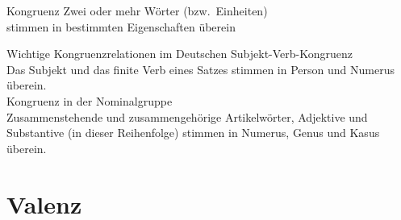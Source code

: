 \begin{frame}
  {Kongruenz}
  \onslide<+->
  \onslide<+->
  Zwei oder mehr Wörter (bzw.\ Einheiten)\\
  \alert{stimmen in bestimmten Eigenschaften überein}\\
  \onslide<+->
  \Zeile
  \begin{exe}
    \ex
    \begin{xlist}
    \end{xlist}
  \end{exe}
  \onslide<+->
  \Halbzeile
  \begin{exe}
    \ex
    \begin{xlist}
    \end{xlist}
  \end{exe}
\end{frame}

\begin{frame}
  {Wichtige Kongruenzrelationen im Deutschen}
  \onslide<+->
  \onslide<+->
  \alert{Subjekt-Verb-Kongruenz}\\
  \Viertelzeile
  Das Subjekt und das finite Verb eines Satzes stimmen in \alert{Person} und \alert{Numerus} überein.\\
  \Zeile
  \onslide<+->
  \Zeile
  \alert{Kongruenz in der Nominalgruppe}\\
  \Viertelzeile
  Zusammenstehende und zusammengehörige Artikelwörter, Adjektive und Substantive (in dieser Reihenfolge) stimmen in \alert{Numerus}, \alert{Genus} und \alert{Kasus} überein.
\end{frame}

\section{Valenz}

